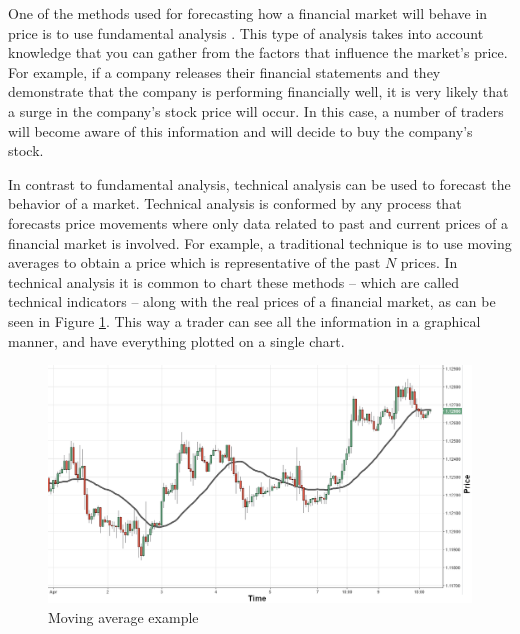One of the methods used for forecasting how a financial market will behave in
price is to use fundamental analysis \cite{Kadiri2015}. This type of analysis takes into %
account knowledge that you can gather from the factors that influence the %
market's price. For example, if a company releases their financial statements
and they demonstrate that the company is performing financially well, it is very
likely that a surge in the company's stock price will occur. In this case, a
number of traders will become aware of this information and will decide to buy
the company's stock.

In contrast to fundamental analysis, technical analysis can be used to forecast
the behavior of a market. Technical analysis is conformed by any process that
forecasts price movements where only data related to past and current prices of
a financial market is involved. For example, a traditional technique is to use
moving averages to obtain a price which is representative of the past $N$
prices. In technical analysis it is common to chart these methods -- which are
called technical indicators -- along with the real prices of a financial market,
as can be seen in Figure \ref{figure:moving-average-example}. This way a trader
can see all the information in a graphical manner, and have everything plotted
on a single chart.

\begin{figure}
  \centering
  \includegraphics[width=1.0\textwidth]{img/moving-average.png}
  \caption{Moving average example}
  \label{figure:moving-average-example}
\end{figure}

